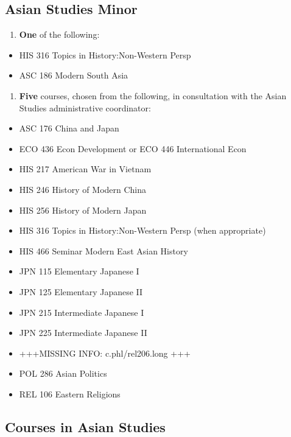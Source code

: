 \documentclass[
  letterpaper,
]{scrbook}
\providecommand{\tightlist}{%
  \setlength{\itemsep}{0pt}\setlength{\parskip}{0pt}}
\begin{document}
\subsection{Asian Studies Minor}\label{asian-studies-minor}

\begin{enumerate}
\def\labelenumi{\arabic{enumi}.}
\tightlist
\item
  \textbf{One} of the following:
\end{enumerate}

\begin{itemize}
\tightlist
\item
  HIS 316 Topics in History:Non-Western Persp
\item
  ASC 186 Modern South Asia
\end{itemize}

\begin{enumerate}
\def\labelenumi{\arabic{enumi}.}
\setcounter{enumi}{1}
\tightlist
\item
  \textbf{Five} courses, chosen from the following, in consultation with
  the Asian Studies administrative coordinator:
\end{enumerate}

\begin{itemize}
\tightlist
\item
  ASC 176 China and Japan
\item
  ECO 436 Econ Development or ECO 446 International Econ
\item
  HIS 217 American War in Vietnam
\item
  HIS 246 History of Modern China
\item
  HIS 256 History of Modern Japan
\item
  HIS 316 Topics in History:Non-Western Persp (when appropriate)
\item
  HIS 466 Seminar Modern East Asian History
\item
  JPN 115 Elementary Japanese I
\item
  JPN 125 Elementary Japanese II
\item
  JPN 215 Intermediate Japanese I
\item
  JPN 225 Intermediate Japanese II
\item
  +++MISSING INFO: c.phl/rel206.long +++
\item
  POL 286 Asian Politics
\item
  REL 106 Eastern Religions
\end{itemize}

\subsection{Courses in Asian Studies}\label{courses-in-asian-studies}
\end{document}
